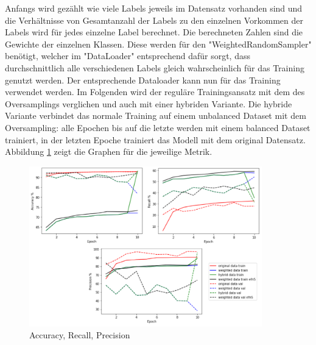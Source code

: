 \documentclass[12pt, a4paper]{article}
\begin{document}
Anfangs wird gezählt wie viele Labels jeweils im Datensatz vorhanden sind und die Verhältnisse von Gesamtanzahl der Labels zu den einzelnen Vorkommen der Labels wird für jedes einzelne Label berechnet. Die berechneten Zahlen sind die Gewichte der einzelnen Klassen. Diese werden für den "WeightedRandomSampler" benötigt, welcher im "DataLoader" entsprechend dafür sorgt, dass durchschnittlich alle verschiedenen Labels gleich wahrscheinlich für das Training genutzt werden. Der entsprechende Dataloader kann nun für das Training verwendet werden. Im Folgenden wird der reguläre Trainingsansatz mit dem des Oversamplings verglichen und auch mit einer hybriden Variante. Die hybride Variante verbindet das normale Training auf einem unbalanced Dataset mit dem Oversampling: alle Epochen bis auf die letzte werden mit einem balanced Dataset trainiert, in der letzten Epoche trainiert das Modell mit dem original Datensatz. Abbildung \ref{fig:arp} zeigt die Graphen für die jeweilige Metrik.

\begin{figure}[t]
\centering
\includegraphics[width=0.9\textwidth]{metrics-acc-recall-prec.png}
\caption{Accuracy, Recall, Precision}
\label{fig:arp}
\end{figure}
\end{document}
